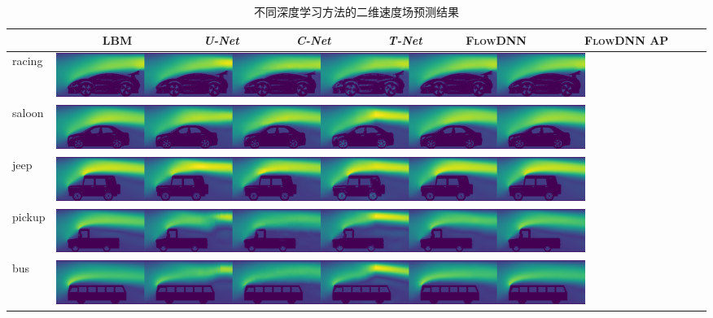 \begin{table}[htp]
	\caption{不同深度学习方法的二维速度场预测结果}
	
	
	\label{tab:total_comp_case}
	\centering
	\begin{tabularx}{14cm}{p{0.8cm}p{1.9cm}p{1.5cm}p{1.5cm}p{1.5cm}p{1.5cm}p{2.6cm}}
		\toprule
		& ~~~~~~~LBM  & ~~~~\textit{U-Net} & ~~~~\textit{C-Net} & ~~~~\textit{T-Net} & ~~\textsc{FlowDNN} & ~~\textsc{FlowDNN} AP   \\
		\midrule
		
		racing &\multicolumn{6}{l}{
			\begin{minipage}{\textwidth}
				\includegraphics[width=0.82\textwidth]{./figures/data/pic_xin/final_35.png}
			\end{minipage}}
			\\
			
			saloon &\multicolumn{6}{l}{
				\begin{minipage}{\textwidth}
					\includegraphics[width=0.82\textwidth]{./figures/data/pic_xin/final_32.png}
				\end{minipage}}
				\\
				jeep &\multicolumn{6}{l}{
					\begin{minipage}{\textwidth}
						\includegraphics[width=0.82\textwidth]{./figures/data/pic_xin/final_20.png}
					\end{minipage}}
					\\
					pickup &\multicolumn{6}{l}{
						\begin{minipage}{\textwidth}
							\includegraphics[width=0.82\textwidth]{./figures/data/pic_xin/final_39.png}
						\end{minipage}}
						\\	
						bus &\multicolumn{6}{l}{
							\begin{minipage}{\textwidth}
								\includegraphics[width=0.82\textwidth]{./figures/data/pic_xin/final_8.png}
							\end{minipage}}
							\\
							\bottomrule
						\end{tabularx}
					\end{table}

